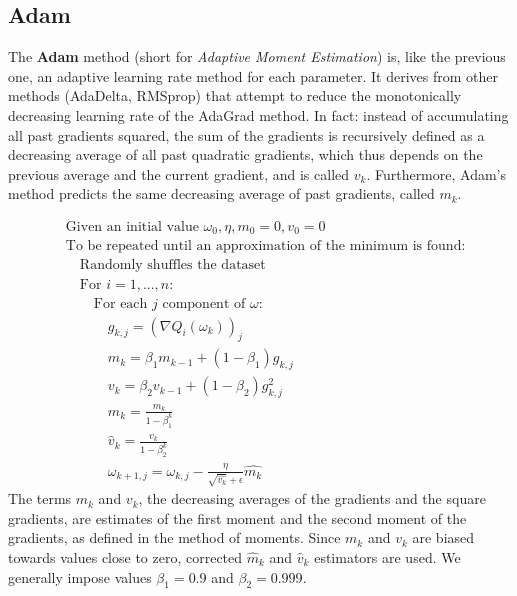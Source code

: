 \subsection{Adam \cite{kingma_adam_2017}}\label{adam}
The \textbf{Adam} method (short for \textit{Adaptive Moment Estimation}) is, like the previous one, an adaptive learning rate method for each parameter. It derives from other methods (AdaDelta, RMSprop) that attempt to reduce the monotonically decreasing learning rate of the AdaGrad method. In fact: instead of accumulating all past gradients squared, the sum of the gradients is recursively defined as a decreasing average of all past quadratic gradients, which thus depends on the previous average and the current gradient, and is called $v_k$. Furthermore, Adam's method predicts the same decreasing average of past gradients, called $m_k$.


\begin{align*}
    &\text{Given an initial value }\omega_0, \eta, m_0=0, v_0=0\\
    &\text{To be repeated until an approximation of the minimum is found:}\\
    &\quad\text{Randomly shuffles the dataset}\\
    &\quad\text{For }i=1,...,n:\\
    &\quad\quad \text{For each $j$ component of $\omega$:}\\
    &\quad\quad\quad g_{k,j}=(\nabla Q_i(\omega_k))_j\\
    &\quad\quad\quad m_k=\beta_1m_{k-1}+(1-\beta_1)g_{k,j}\\
    &\quad\quad\quad v_k=\beta_2v_{k-1}+(1-\beta_2)g^2_{k,j}\\
    &\quad\quad\quad \hat{m}_k = \frac{m_k}{1-\beta_1^k}\\
    &\quad\quad\quad \hat{v}_k = \frac{v_k}{1-\beta_2^k}\\
    &\quad\quad\quad\omega_{k+1,j}=\omega_{k,j} - \frac{\eta}{\sqrt{\hat{v_k}}+\epsilon}\hat{m_k}
\end{align*}
The terms $m_k$ and $v_k$, the decreasing averages of the gradients and the square gradients, are estimates of the first moment and the second moment of the gradients, as defined in the method of moments. Since $m_k$ and $v_k$ are biased towards values close to zero, corrected $\hat{m}_k$ and $\hat{v}_k$ estimators are used. We generally impose values $\beta_1=0.9$ and $\beta_2=0.999$.

